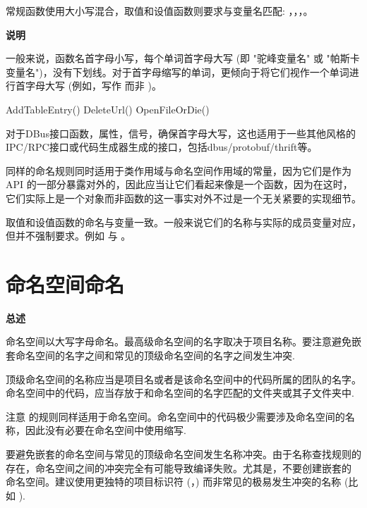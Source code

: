 常规函数使用大小写混合，取值和设值函数则要求与变量名匹配: ，，，。

\textbf{说明}

一般来说，函数名首字母小写，每个单词首字母大写 (即 "驼峰变量名" 或 "帕斯卡变量名")，没有下划线。对于首字母缩写的单词，更倾向于将它们视作一个单词进行首字母大写 (例如，写作  而非 )。

\begin{cppcode}
  AddTableEntry()
  DeleteUrl()
  OpenFileOrDie()
\end{cppcode}

\begin{DWarn}
  对于DBus接口函数，属性，信号，确保首字母大写，这也适用于一些其他风格的IPC/RPC接口或代码生成器生成的接口，包括dbus/protobuf/thrift等。
\end{DWarn}

同样的命名规则同时适用于类作用域与命名空间作用域的常量，因为它们是作为 API 的一部分暴露对外的，因此应当让它们看起来像是一个函数，因为在这时，它们实际上是一个对象而非函数的这一事实对外不过是一个无关紧要的实现细节。

取值和设值函数的命名与变量一致。一般来说它们的名称与实际的成员变量对应，但并不强制要求。例如  与 。

\section{命名空间命名}

\textbf{总述}
\begin{DWarn}
  命名空间以大写字母命名。最高级命名空间的名字取决于项目名称。要注意避免嵌套命名空间的名字之间和常见的顶级命名空间的名字之间发生冲突.
\end{DWarn}

顶级命名空间的名称应当是项目名或者是该命名空间中的代码所属的团队的名字。命名空间中的代码，应当存放于和命名空间的名字匹配的文件夹或其子文件夹中.

注意  的规则同样适用于命名空间。命名空间中的代码极少需要涉及命名空间的名称，因此没有必要在命名空间中使用缩写.

要避免嵌套的命名空间与常见的顶级命名空间发生名称冲突。由于名称查找规则的存在，命名空间之间的冲突完全有可能导致编译失败。尤其是，不要创建嵌套的  命名空间。建议使用更独特的项目标识符 (，) 而非常见的极易发生冲突的名称 (比如 ).

